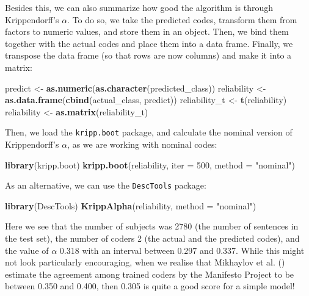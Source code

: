 \documentclass[
]{book}
\newenvironment{Shaded}{\begin{snugshade}}{\end{snugshade}}
\newcommand{\AttributeTok}[1]{\textcolor[rgb]{0.13,0.29,0.53}{#1}}
\newcommand{\DecValTok}[1]{\textcolor[rgb]{0.00,0.00,0.81}{#1}}
\newcommand{\FunctionTok}[1]{\textcolor[rgb]{0.13,0.29,0.53}{\textbf{#1}}}
\newcommand{\NormalTok}[1]{#1}
\newcommand{\OtherTok}[1]{\textcolor[rgb]{0.56,0.35,0.01}{#1}}
\newcommand{\StringTok}[1]{\textcolor[rgb]{0.31,0.60,0.02}{#1}}
\begin{document}
Besides this, we can also summarize how good the algorithm is through Krippendorff's \(\alpha\). To do so, we take the predicted codes, transform them from factors to numeric values, and store them in an object. Then, we bind them together with the actual codes and place them into a data frame. Finally, we transpose the data frame (so that rows are now columns) and make it into a matrix:

\begin{Shaded}
\begin{Highlighting}[]
\NormalTok{predict }\OtherTok{\textless{}{-}} \FunctionTok{as.numeric}\NormalTok{(}\FunctionTok{as.character}\NormalTok{(predicted\_class))}
\NormalTok{reliability }\OtherTok{\textless{}{-}} \FunctionTok{as.data.frame}\NormalTok{(}\FunctionTok{cbind}\NormalTok{(actual\_class, predict))}
\NormalTok{reliability\_t }\OtherTok{\textless{}{-}} \FunctionTok{t}\NormalTok{(reliability)}
\NormalTok{reliability }\OtherTok{\textless{}{-}} \FunctionTok{as.matrix}\NormalTok{(reliability\_t)}
\end{Highlighting}
\end{Shaded}

Then, we load the \texttt{kripp.boot} package, and calculate the nominal version of Krippendorff's \(\alpha\), as we are working with nominal codes:

\begin{Shaded}
\begin{Highlighting}[]
\FunctionTok{library}\NormalTok{(kripp.boot)}
\FunctionTok{kripp.boot}\NormalTok{(reliability, }\AttributeTok{iter =} \DecValTok{500}\NormalTok{, }\AttributeTok{method =} \StringTok{"nominal"}\NormalTok{)}
\end{Highlighting}
\end{Shaded}

As an alternative, we can use the \texttt{DescTools} package:

\begin{Shaded}
\begin{Highlighting}[]
\FunctionTok{library}\NormalTok{(DescTools)}
\FunctionTok{KrippAlpha}\NormalTok{(reliability, }\AttributeTok{method =} \StringTok{"nominal"}\NormalTok{)}
\end{Highlighting}
\end{Shaded}

Here we see that the number of subjects was 2780 (the number of sentences in the test set), the number of coders 2 (the actual and the predicted codes), and the value of \(\alpha\) 0.318 with an interval between 0.297 and 0.337. While this might not look particularly encouraging, when we realise that Mikhaylov et al. () estimate the agreement among trained coders by the Manifesto Project to be between 0.350 and 0.400, then 0.305 is quite a good score for a simple model!
\end{document}
